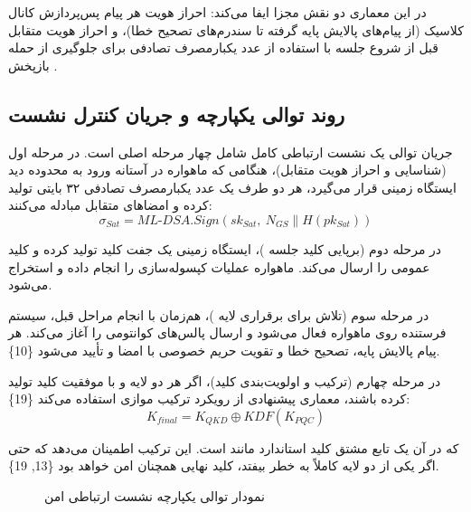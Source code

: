 \documentclass[a4paper,14pt]{extreport}
\begin{document}
 در این معماری دو نقش مجزا ایفا می‌کند: احراز هویت هر پیام پس‌پردازش کانال کلاسیک  (از پیام‌های پالایش پایه گرفته تا سندرم‌های تصحیح خطا)، و احراز هویت متقابل  قبل از شروع جلسه  با استفاده از عدد یکبارمصرف  تصادفی برای جلوگیری از حمله بازپخش .

\subsection{روند توالی یکپارچه و جریان کنترل نشست}

جریان توالی یک نشست ارتباطی کامل شامل چهار مرحله اصلی است. در مرحله اول (شناسایی و احراز هویت متقابل)، هنگامی که ماهواره در آستانه ورود به محدوده دید ایستگاه زمینی قرار می‌گیرد، هر دو طرف یک عدد یکبارمصرف تصادفی ۳۲ بایتی تولید کرده و امضاهای متقابل  مبادله می‌کنند:
\begin{equation}
\sigma_{Sat} = ML\text{-}DSA.Sign(sk_{Sat},\ N_{GS} \| H(pk_{Sat}))
\label{eq:mldsa_sign}
\end{equation}

در مرحله دوم (برپایی کلید جلسه )، ایستگاه زمینی یک جفت کلید  تولید کرده و کلید عمومی را ارسال می‌کند. ماهواره عملیات کپسوله‌سازی را انجام داده و  استخراج می‌شود.

در مرحله سوم (تلاش برای برقراری لایه )، هم‌زمان با انجام مراحل قبل، سیستم  فرستنده روی ماهواره فعال می‌شود و ارسال پالس‌های کوانتومی را آغاز می‌کند. هر پیام پالایش پایه، تصحیح خطا و تقویت حریم خصوصی با  امضا و تأیید می‌شود \{10\}.

در مرحله چهارم (ترکیب و اولویت‌بندی کلید)، اگر هر دو لایه  و  با موفقیت کلید تولید کرده باشند، معماری پیشنهادی از رویکرد ترکیب موازی  استفاده می‌کند \{19\}:
\begin{equation}
K_{final} = K_{QKD} \oplus KDF(K_{PQC})
\label{eq:key_combination}
\end{equation}

که در آن  یک تابع مشتق کلید  استاندارد مانند  است. این ترکیب اطمینان می‌دهد که حتی اگر یکی از دو لایه کاملاً به خطر بیفتد، کلید نهایی همچنان امن خواهد بود \{13, 19\}.

\begin{figure}[H]
\centering
{}
\caption{نمودار توالی یکپارچه نشست ارتباطی امن}
\label{fig:3-3}
\end{figure}
\end{document}
